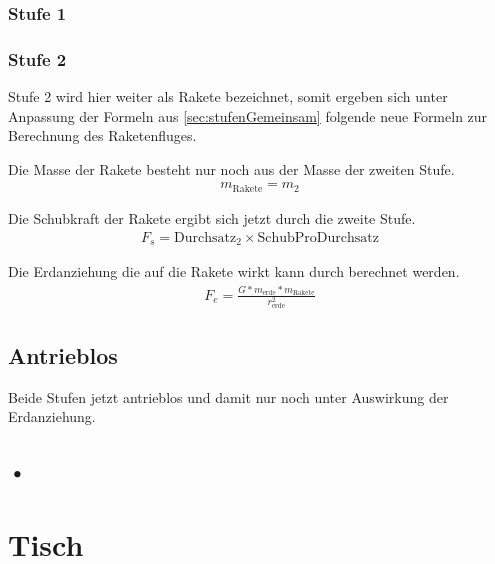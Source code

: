 \documentclass[10pt]{scrartcl}
\begin{document}
	\subsubsection{Stufe 1}
	
	\subsubsection{Stufe 2}
	Stufe 2 wird hier weiter als Rakete bezeichnet, somit ergeben sich unter Anpassung der Formeln aus \ref{sec:stufenGemeinsam} folgende neue Formeln zur Berechnung des Raketenfluges.
	
	Die Masse der Rakete besteht nur noch aus der Masse der zweiten Stufe.
	\begin{align} 
	m_{\text{Rakete}} = m_2
	\end{align}

	Die Schubkraft der Rakete ergibt sich jetzt durch die zweite Stufe.
	\begin{align}
	F_s = \text{Durchsatz}_2 \times \text{SchubProDurchsatz}
	\end{align}

	Die Erdanziehung die auf die Rakete wirkt kann durch berechnet werden.
	\begin{align}
	F_e = \frac{G * m_{\text{erde}} * m_{\text{Rakete}}}{r_{\text{erde}}^2}
	\end{align}
	
	\subsection{Antrieblos}
	Beide Stufen  jetzt antrieblos und damit nur noch unter Auswirkung der Erdanziehung.
	
	
	\subsection{•}	
	
\section{Tisch}	
		
\end{document}

